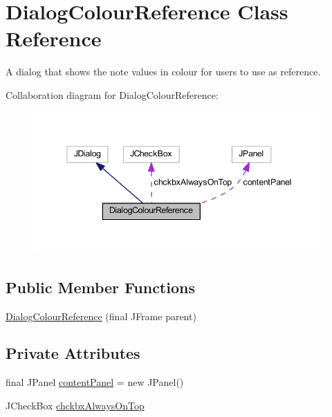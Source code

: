 \hypertarget{classcom_1_1lclion_1_1midigui_1_1_dialog_colour_reference}{\section{Dialog\+Colour\+Reference Class Reference}
\label{classcom_1_1lclion_1_1midigui_1_1_dialog_colour_reference}
}


A dialog that shows the note values in colour for users to use as reference.  




Collaboration diagram for Dialog\+Colour\+Reference\+:\nopagebreak
\begin{figure}[H]
\begin{center}
\leavevmode
\includegraphics[width=345pt]{classcom_1_1lclion_1_1midigui_1_1_dialog_colour_reference__coll__graph}
\end{center}
\end{figure}
\subsection*{Public Member Functions}
\begin{DoxyCompactItemize}
\item 
\hyperlink{classcom_1_1lclion_1_1midigui_1_1_dialog_colour_reference_ae98709ca14db48a02783451719e792eb}{Dialog\+Colour\+Reference} (final J\+Frame parent)
\end{DoxyCompactItemize}
\subsection*{Private Attributes}
\begin{DoxyCompactItemize}
\item 
final J\+Panel \hyperlink{classcom_1_1lclion_1_1midigui_1_1_dialog_colour_reference_ac383c7b38c74b9e1cc245a00de4fbb5e}{content\+Panel} = new J\+Panel()
\item 
J\+Check\+Box \hyperlink{classcom_1_1lclion_1_1midigui_1_1_dialog_colour_reference_afb212360a6ff5330b0ca37ea40c372a8}{chckbx\+Always\+On\+Top}
\end{DoxyCompactItemize}


